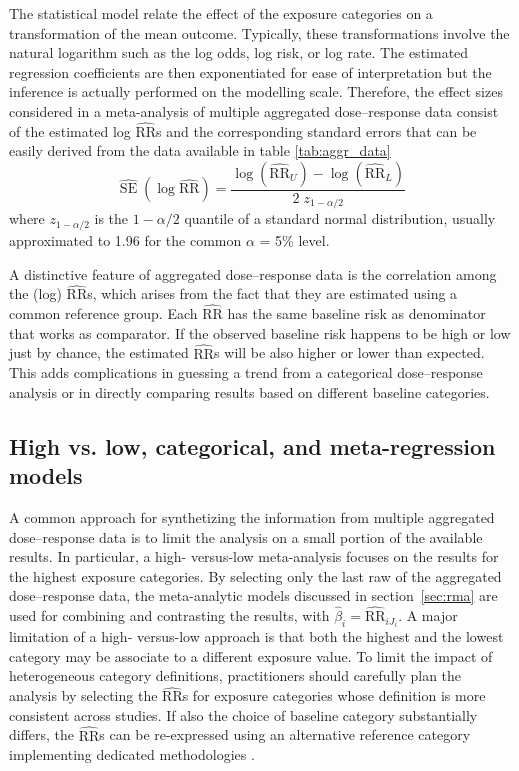 \documentclass[11pt,a4paper,twoside,openany]{book}\usepackage{knitr}
\DeclareMathOperator{\SE}{SE}
\begin{document}
{The statistical model relate the effect of the exposure categories on a transformation of the mean outcome. Typically, these transformations involve the natural logarithm such as the log odds, log risk, or log rate. The estimated regression coefficients are then exponentiated for ease of interpretation but the inference is actually performed on the modelling scale. Therefore, the effect sizes considered in a meta-analysis of multiple aggregated dose--response data consist of the estimated log $\widehat{\mathrm{RR}}$s and the corresponding standard errors that can be easily derived from the data available in table \ref{tab:aggr_data}
\begin{equation}
\widehat{\SE} \left( \log \widehat{\mathrm{RR}} \right) = \frac{\log \left(\widehat{\mathrm{RR}}_U \right) - \log \left(\widehat{\mathrm{RR}}_L \right)}{2\; z_{1- \alpha/2}}
\label{eq:se_logrr}
\end{equation} 
\noindent where $z_{1- \alpha/2}$ is the $1- \alpha/2$ quantile of a standard normal distribution, usually approximated to 1.96 for the common $\alpha$ = 5\% level.

A distinctive feature of aggregated dose--response data is the correlation among the (log) $\widehat{\mathrm{RR}}$s, which arises from the fact that they are estimated using a common reference group. Each $\widehat{\mathrm{RR}}$ has the same baseline risk as denominator that works as comparator. If the observed baseline risk happens to be high or low just by chance, the estimated $\widehat{\mathrm{RR}}$s will be also higher or lower than expected. This adds complications in guessing a trend from a categorical dose--response analysis or in directly comparing results based on different baseline categories. 


\subsection{High vs. low, categorical, and meta-regression models}

A common approach for synthetizing the information from multiple aggregated dose--response data is to limit the analysis on a small portion of the available results. In particular, a high- versus-low meta-analysis focuses on the results for the highest exposure categories. By selecting only the last raw of the aggregated dose--response data, the meta-analytic models discussed in section~\ref{sec:rma} are used for combining and contrasting the results, with $\hat \beta_i = \widehat{\mathrm{RR}}_{iJ_i}$. 
A major limitation of a high- versus-low approach is that both the highest and the lowest category may be associate to a different exposure value. To limit the impact of heterogeneous category definitions, practitioners should carefully plan the analysis by selecting the $\widehat{\mathrm{RR}}$s for exposure categories whose definition is more consistent across studies. If also the choice of baseline category substantially differs, the $\widehat{\mathrm{RR}}$s can be re-expressed using an alternative reference category implementing dedicated methodologies \cite{hamling2008facilitating}.

}
\end{document}
